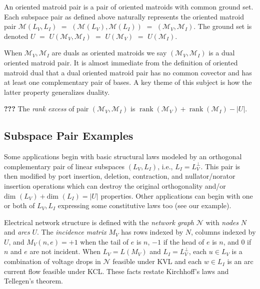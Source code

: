 \documentclass{amsproc-sunycstr}
\theoremstyle{plain}
\theoremstyle{definition}
\theoremstyle{remark}
\DeclareMathOperator{\rank}{rank}
\begin{document}

An oriented matroid pair is a pair of oriented matroids with common
ground set.  Each subspace pair as defined above naturally 
represents the oriented matroid pair $\mathcal{M}(L_V,L_I)$
$=$ $(\mathcal{M}(L_V),\mathcal{M}(L_I))$
$=$ $(\mathcal{M}_V,\mathcal{M}_I)$.  The ground set is denoted
$U$ $=$ $U(\mathcal{M}_V,\mathcal{M}_I)$ $=$
$U(\mathcal{M}_V)$ $=$ $U(\mathcal{M}_I)$.

When $\mathcal{M}_V,\mathcal{M}_I$ are duals as oriented matroids we
say $(\mathcal{M}_V,\mathcal{M}_I)$ is a dual oriented matroid pair.
It is almost immediate from the definition of oriented matroid dual that
a dual oriented matroid pair has no common covector and has at least one
complementary pair of bases.  A key theme of this subject is
how the latter property generalizes duality.  

\textbf{???}
The \textit{rank excess} of pair $(\mathcal{M}_V,\mathcal{M}_I)$ is 
$\rank(\mathcal{M}_V)+\rank(\mathcal{M}_I)-|U|$.  

\subsection{Subspace Pair Examples}

Some applications begin with basic structural laws
modeled by an orthogonal complementary pair of 
linear subspaces $(L_V, L_I)$, i.e., $L_I=L_V^\perp$.  This pair 
is then modified by port insertion, deletion, contraction, and 
nullator/norator insertion operations which can 
destroy the original orthogonality and/or 
$\mbox{dim\ }(L_V)+\mbox{dim\ }(L_I)=|U|$ properties.
Other applications can begin with one or both of $L_V,L_I$ 
expressing some constitutive laws too (see our example).

Electrical network structure is defined 
with the \textit{network graph}
$\mathcal{N}$ with \textit{nodes} $N$  and \textit{arcs} $U$.  
The \textit{incidence matrix} $M_V$ has rows indexed by $N$,
columns indexed by $U$, and $M_V(n,e)=+1$ when the tail of $e$ is
$n$, $-1$ if the head of $e$ is $n$, and $0$ if $n$ and $e$ are not incident.
When $L_V=L(M_V)$ and $L_I=L_V^\perp$,
each $u\in L_V$ is a combination of voltage drops in $\mathcal{N}$ 
feasible under KVL and each $w\in L_I$ is 
an arc current flow feasible under KCL.  These facts 
restate Kirchhoff's laws and Tellegen's theorem.  
\end{document}
